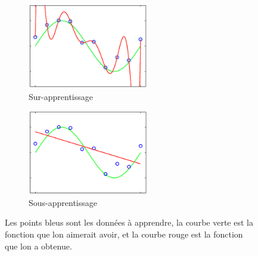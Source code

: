 \documentclass[11pt,final,ENIB]{sdm}
\begin{document}
{			\begin{figure}[!ht]
				\centering
				\begin{subfigure}{0.45\textwidth}
					\centering
					\includegraphics[natwidth=489,natheight=346,width=200,height=140]{figures/overfitting.png}
					\caption{Sur-apprentissage}
					\label{fig:overfitting}
				\end{subfigure}
				\hspace*{\fill}
				\begin{subfigure}{0.45\textwidth}	
					\centering
					\includegraphics[natwidth=508,natheight=360,width=200,height=140]{figures/underfitting.png}
					\caption{Sous-apprentissage}
					\label{fig:underfitting}
				\end{subfigure}
				\caption{Les points bleus sont les donn\'ees \`a apprendre, la courbe verte est la fonction que l\textquotesingle on aimerait avoir, et la courbe rouge est la fonction que l\textquotesingle on a obtenue.}
			\end{figure}

}
\end{document}

